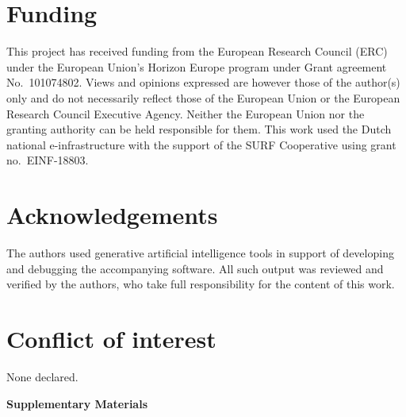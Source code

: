 \documentclass[11pt]{article}
\theoremstyle{plain}
\theoremstyle{definition}
\theoremstyle{remark}
\newcommand{\1}{\mathds{1}}
\newcommand{\startsupplement}{%
  \clearpage
  \setcounter{section}{0}%
  \setcounter{equation}{0}%
  \setcounter{figure}{0}%
  \setcounter{table}{0}%
  \setcounter{proposition}{0}%
  \setcounter{corollary}{0}%
  \setcounter{algocf}{0}%
  \renewcommand{\thesection}{S.\arabic{section}}%
  \renewcommand{\thesubsection}{\thesection.\arabic{subsection}}%
  \renewcommand{\theequation}{S\arabic{equation}}%
  \renewcommand{\thefigure}{S\arabic{figure}}%
  \renewcommand{\thetable}{S\arabic{table}}%
  \renewcommand{\theproposition}{S\arabic{proposition}}%
  \renewcommand{\thecorollary}{S\arabic{corollary}}%
  \renewcommand{\thealgocf}{S\arabic{algocf}}%
}
\begin{document}
\section*{Funding}
This project has received funding from the European Research Council (ERC)
under the European Union's Horizon Europe program under Grant agreement
No.~101074802.
Views and opinions expressed are however those of the author(s) only and do not
necessarily reflect those of the European Union or the European Research
Council Executive Agency.
Neither the European Union nor the granting authority can be held responsible
for them.
This work used the Dutch national e-infrastructure with the support of the SURF
Cooperative using grant no.~EINF-18803.

\section*{Acknowledgements}
The authors used generative artificial intelligence tools in support of
developing and debugging the accompanying software.
All such output was reviewed and verified by the authors, who take full
responsibility for the content of this work.

\section*{Conflict of interest}
None declared.


\FloatBarrier





\startsupplement

\begin{center}
  {\Large\bfseries Supplementary Materials}
\end{center}

\medskip






\end{document}
